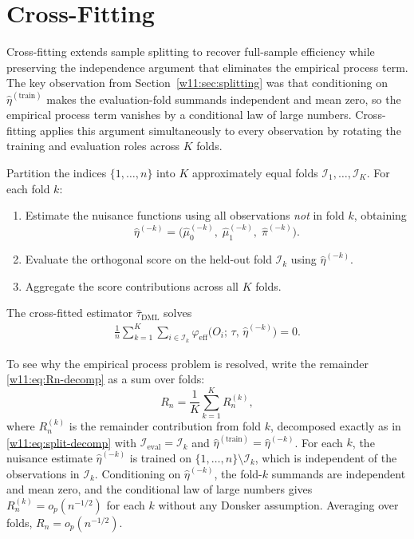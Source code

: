 \documentclass[master.tex]{subfiles}
\begin{document}
\section{Cross-Fitting}
\label{w11:sec:crossfit}

Cross-fitting extends sample splitting to recover full-sample
efficiency while preserving the independence argument that
eliminates the empirical process term.  The key observation from
Section~\ref{w11:sec:splitting} was that conditioning on
$\hat\eta^{(\mathrm{train})}$ makes the evaluation-fold summands
independent and mean zero, so the empirical process term vanishes
by a conditional law of large numbers.  Cross-fitting applies this
argument simultaneously to every observation by rotating the
training and evaluation roles across $K$ folds.

Partition the indices $\{1,\ldots,n\}$ into $K$ approximately
equal folds $\mathcal{I}_1,\ldots,\mathcal{I}_K$.  For each
fold $k$:
\begin{enumerate}
  \item Estimate the nuisance functions using all observations
    \emph{not} in fold $k$, obtaining
    \[
      \hat\eta^{(-k)}
      =
      \bigl(
        \hat\mu_0^{(-k)},\;
        \hat\mu_1^{(-k)},\;
        \hat\pi^{(-k)}
      \bigr).
    \]
  \item Evaluate the orthogonal score on the held-out fold
    $\mathcal{I}_k$ using $\hat\eta^{(-k)}$.
  \item Aggregate the score contributions across all $K$ folds.
\end{enumerate}
The cross-fitted estimator $\hat\tau_{\mathrm{DML}}$ solves
\begin{align}
  \frac{1}{n}
  \sum_{k=1}^K
  \sum_{i \in \mathcal{I}_k}
  \varphi_{\mathrm{eff}}\!\bigl(O_i;\,\tau,\,\hat\eta^{(-k)}\bigr)
  = 0.
  \label{w11:eq:crossfit-moment}
\end{align}

To see why the empirical process problem is resolved, write the
remainder \eqref{w11:eq:Rn-decomp} as a sum over folds:
\[
  R_n = \frac{1}{K}\sum_{k=1}^K R_n^{(k)},
\]
where $R_n^{(k)}$ is the remainder contribution from fold $k$,
decomposed exactly as in \eqref{w11:eq:split-decomp} with
$\mathcal{I}_{\mathrm{eval}} = \mathcal{I}_k$ and
$\hat\eta^{(\mathrm{train})} = \hat\eta^{(-k)}$.  For each $k$,
the nuisance estimate $\hat\eta^{(-k)}$ is trained on
$\{1,\ldots,n\}\setminus\mathcal{I}_k$, which is independent of
the observations in $\mathcal{I}_k$.  Conditioning on
$\hat\eta^{(-k)}$, the fold-$k$ summands are independent and mean
zero, and the conditional law of large numbers gives
$R_n^{(k)} = o_p(n^{-1/2})$ for each $k$ without any Donsker
assumption.  Averaging over folds, $R_n = o_p(n^{-1/2})$.
\end{document}
